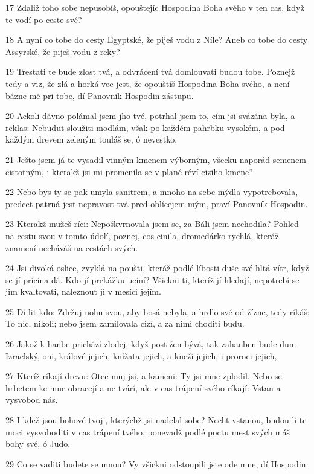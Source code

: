 \par 17 Zdaliž toho sobe nepusobíš, opouštejíc Hospodina Boha svého v ten cas, když te vodí po ceste své?
\par 18 A nyní co tobe do cesty Egyptské, že piješ vodu z Níle? Aneb co tobe do cesty Assyrské, že piješ vodu z reky?
\par 19 Trestati te bude zlost tvá, a odvrácení tvá domlouvati budou tobe. Poznejž tedy a viz, že zlá a horká vec jest, že opouštíš Hospodina Boha svého, a není bázne mé pri tobe, dí Panovník Hospodin zástupu.
\par 20 Ackoli dávno polámal jsem jho tvé, potrhal jsem to, cím jsi svázána byla, a reklas: Nebudut sloužiti modlám, však po každém pahrbku vysokém, a pod každým drevem zeleným touláš se, ó nevestko.
\par 21 Ješto jsem já te vysadil vinným kmenem výborným, všecku naporád semenem cistotným, i kterakž jsi mi promenila se v plané réví cizího kmene?
\par 22 Nebo bys ty se pak umyla sanitrem, a mnoho na sebe mýdla vypotrebovala, predcet patrná jest nepravost tvá pred oblícejem mým, praví Panovník Hospodin.
\par 23 Kterakž mužeš ríci: Nepoškvrnovala jsem se, za Báli jsem nechodila? Pohled na cestu svou v tomto údolí, poznej, cos cinila, dromedárko rychlá, kteráž znamení necháváš na cestách svých.
\par 24 Jsi divoká oslice, zvyklá na poušti, kteráž podlé líbosti duše své hltá vítr, když se jí prícina dá. Kdo jí prekážku uciní? Všickni ti, kteríž jí hledají, nepotrebí se jim kvaltovati, naleznout ji v mesíci jejím.
\par 25 Dí-lit kdo: Zdržuj nohu svou, aby bosá nebyla, a hrdlo své od žízne, tedy ríkáš: To nic, nikoli; nebo jsem zamilovala cizí, a za nimi choditi budu.
\par 26 Jakož k hanbe prichází zlodej, když postižen bývá, tak zahanben bude dum Izraelský, oni, králové jejich, knížata jejich, a kneží jejich, i proroci jejich,
\par 27 Kteríž ríkají drevu: Otec muj jsi, a kameni: Ty jsi mne zplodil. Nebo se hrbetem ke mne obracejí a ne tvárí, ale v cas trápení svého ríkají: Vstan a vysvobod nás.
\par 28 I kdež jsou bohové tvoji, kterýchž jsi nadelal sobe? Necht vstanou, budou-li te moci vysvoboditi v cas trápení tvého, ponevadž podlé poctu mest svých máš bohy své, ó Judo.
\par 29 Co se vaditi budete se mnou? Vy všickni odstoupili jste ode mne, dí Hospodin.
